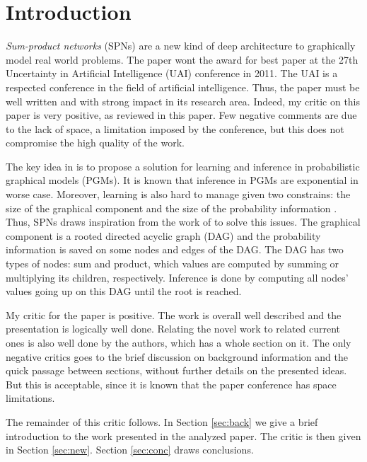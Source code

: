 \section{Introduction}
\label{sec:intro}

\emph{Sum-product networks} (SPNs) \citep{Poon2011} are a new kind of deep architecture to graphically model real world problems.
The paper \citep{Poon2011} wont the award for best paper at the 27th Uncertainty in Artificial Intelligence (UAI) conference in 2011.
The UAI is a respected conference in the field of artificial intelligence.
Thus, the paper must be well written and with strong impact in its research area.
Indeed, my critic on this paper is very positive, as reviewed in this paper.
Few negative comments are due to the lack of space, a limitation imposed by the conference, but this does not compromise the high quality of the work.

The key idea in \citep{Poon2011} is to propose a solution for learning and inference in probabilistic graphical models (PGMs).
It is known \citep{koll09} that inference in PGMs are exponential in worse case.
Moreover, learning is also hard to manage given two constrains: the size of the graphical component and the size of the probability information \citep{Zhao2015}.
Thus, SPNs draws inspiration from the work of \cite{Darwiche2009} to solve this issues.
The graphical component is a rooted directed acyclic graph (DAG) and the probability information is saved on some nodes and edges of the DAG.
The DAG has two types of nodes: sum and product, which values are computed by summing or multiplying its children, respectively.
Inference is done by computing all nodes' values going up on this DAG until the root is reached.

My critic for the paper is positive.
The work is overall well described and the presentation is logically well done.
Relating the novel work to related current ones is also well done by the authors, which has a whole section on it.
The only negative critics goes to the brief discussion on background information and the quick passage between sections, without further details on the presented ideas.
But this is acceptable, since it is known that the paper conference has space limitations.

The remainder of this critic follows.
In Section \ref{sec:back} we give a brief introduction to the work presented in the analyzed paper.
The critic is then given in Section \ref{sec:new}.
Section \ref{sec:conc} draws conclusions.